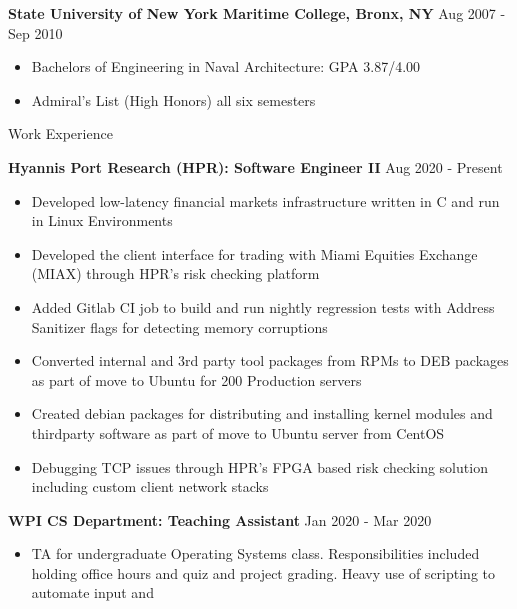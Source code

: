 \documentclass[10pt,a4paper]{article}
\begin{document}
{\begin{tcolorbox}
      \large{\textbf{State University of New York Maritime College, Bronx, NY}}
      \hfill
      \large{Aug 2007 - Sep 2010}
      \begin{itemize}[noitemsep]
        \item Bachelors of Engineering in Naval Architecture: GPA 3.87/4.00
        \item Admiral's List (High Honors) all six semesters 
      \end{itemize}
\end{tcolorbox}

\begin{tcolorbox}

  {\selectfont
    \begin{center}
      \LARGE{Work Experience}
    \end{center}
  }

  \tcblower

  \large{\textbf{Hyannis Port Research (HPR): Software Engineer II}}
  \hfill
  \large{Aug 2020 - Present}
  \begin{itemize}[noitemsep]
    \item Developed low-latency financial markets infrastructure written in C and run in Linux Environments
    \item Developed the client interface for trading with Miami Equities Exchange (MIAX) through HPR's risk checking platform
    \item Added Gitlab CI job to build and run nightly regression tests with Address Sanitizer flags for detecting memory corruptions
    \item Converted internal and 3rd party tool packages from RPMs to DEB packages as part of move to Ubuntu for 200 Production servers
    \item Created debian packages for distributing and installing kernel modules and thirdparty software as part of move to Ubuntu server from CentOS
    \item Debugging TCP issues through HPR's FPGA based risk checking solution including custom client network stacks
  \end{itemize}

  \large{\textbf{WPI CS Department: Teaching Assistant}}
  \hfill
  \large{Jan 2020 - Mar 2020}
  \begin{itemize}[noitemsep]
    \item TA for undergraduate Operating Systems class. Responsibilities included holding office hours and quiz and project grading. Heavy use of scripting to automate input and
  \end{itemize}


\end{tcolorbox}}
\end{document}
